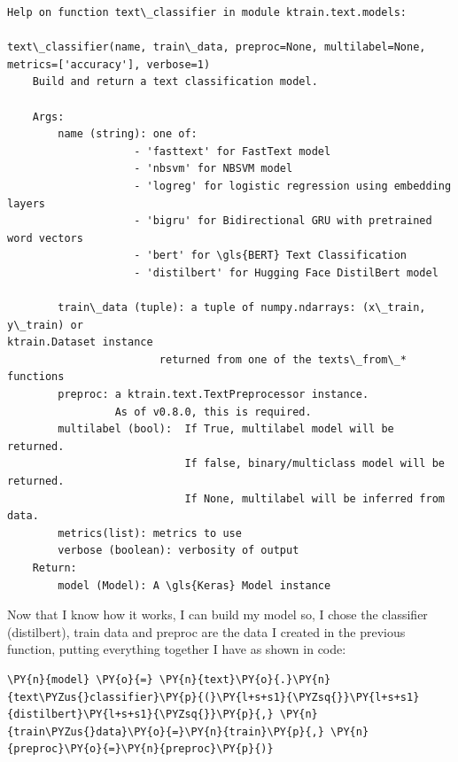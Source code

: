     \begin{Verbatim}[commandchars=\\\{\},fontsize=\footnotesize]
Help on function text\_classifier in module ktrain.text.models:

text\_classifier(name, train\_data, preproc=None, multilabel=None,
metrics=['accuracy'], verbose=1)
    Build and return a text classification model.

    Args:
        name (string): one of:
                    - 'fasttext' for FastText model
                    - 'nbsvm' for NBSVM model
                    - 'logreg' for logistic regression using embedding layers
                    - 'bigru' for Bidirectional GRU with pretrained word vectors
                    - 'bert' for \gls{BERT} Text Classification
                    - 'distilbert' for Hugging Face DistilBert model

        train\_data (tuple): a tuple of numpy.ndarrays: (x\_train, y\_train) or
ktrain.Dataset instance
                        returned from one of the texts\_from\_* functions
        preproc: a ktrain.text.TextPreprocessor instance.
                 As of v0.8.0, this is required.
        multilabel (bool):  If True, multilabel model will be returned.
                            If false, binary/multiclass model will be returned.
                            If None, multilabel will be inferred from data.
        metrics(list): metrics to use
        verbose (boolean): verbosity of output
    Return:
        model (Model): A \gls{Keras} Model instance

    \end{Verbatim}

Now that I know how it works, I can build my model so, I chose the classifier (distilbert), train data and preproc are the data I created in the previous function, putting everything together I have as shown in code:
    \begin{tcolorbox}[breakable, size=fbox, boxrule=1pt, pad at break*=1mm,colback=cellbackground, colframe=cellborder]
\begin{Verbatim}[commandchars=\\\{\},fontsize=\footnotesize]
\PY{n}{model} \PY{o}{=} \PY{n}{text}\PY{o}{.}\PY{n}{text\PYZus{}classifier}\PY{p}{(}\PY{l+s+s1}{\PYZsq{}}\PY{l+s+s1}{distilbert}\PY{l+s+s1}{\PYZsq{}}\PY{p}{,} \PY{n}{train\PYZus{}data}\PY{o}{=}\PY{n}{train}\PY{p}{,} \PY{n}{preproc}\PY{o}{=}\PY{n}{preproc}\PY{p}{)}
\end{Verbatim}
\end{tcolorbox}

